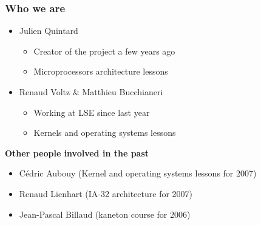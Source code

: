 \begin{frame}
  \frametitle{Who we are}

  \begin{itemize}
    \item
      Julien Quintard
      \begin{itemize}
	\item
	Creator of the project a few years ago
        \item
	Microprocessors architecture lessons
      \end{itemize}
    \item
      Renaud Voltz \& Matthieu Bucchianeri
      \begin{itemize}
	\item
	Working at LSE since last year
	\item
	Kernels and operating systems lessons
      \end{itemize}
  \end{itemize}

  \-

  \textbf{Other people involved in the past}

  \begin{itemize}
    \item
      C\'{e}dric Aubouy (Kernel and operating systems lessons for 2007)
    \item
      Renaud Lienhart (IA-32 architecture for 2007)
    \item
      Jean-Pascal Billaud (kaneton course for 2006)
  \end{itemize}

\end{frame}


